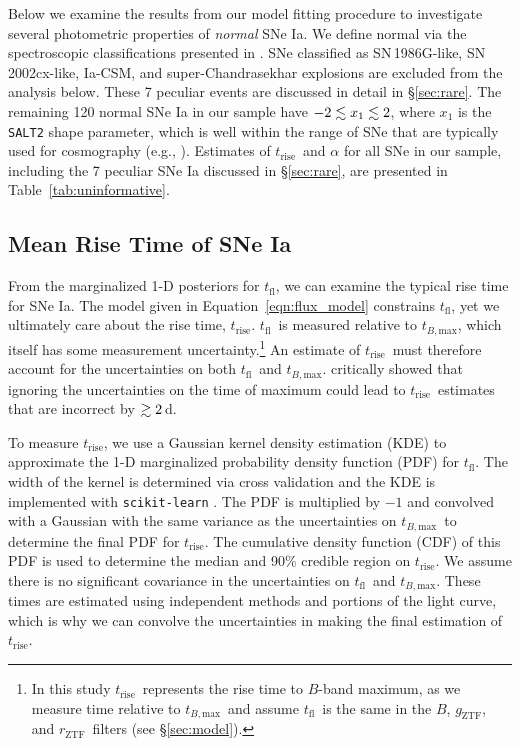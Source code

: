 \documentclass[twocolumn]{./aastex63}
\newcommand{\rztf}{$r_\mathrm{ZTF}$}
\newcommand{\gztf}{$g_\mathrm{ZTF}$}
\newcommand{\tfl}{$t_\mathrm{fl}$}
\newcommand{\trise}{$t_\mathrm{rise}$}
\newcommand{\tbmax}{$t_{B,\mathrm{max}}$}
\begin{document}
Below we examine the results from our model fitting procedure to investigate
several photometric properties of \textit{normal} SNe Ia. We define normal via
the spectroscopic classifications presented in \citet{Yao19}. SNe classified
as SN\,1986G-like, SN\,2002cx-like, Ia-CSM, and super-Chandrasekhar explosions
are excluded from the analysis below. These 7 peculiar events are discussed in
detail in \S\ref{sec:rare}. The remaining 120 normal SNe Ia in our sample
have $-2 \lesssim x_1 \lesssim 2$, where $x_1$ is the \texttt{SALT2} shape parameter,
which is well within the range of SNe that are typically used for cosmography
(e.g., \citealt{Scolnic18}). Estimates of \trise\ and $\alpha$ for all SNe in
our sample, including the 7 peculiar SNe Ia discussed in \S\ref{sec:rare}, are
presented in Table~\ref{tab:uninformative}.

\subsection{Mean Rise Time of SNe Ia}\label{sec:mean_rise}

From the marginalized 1-D posteriors for \tfl, we can examine the typical rise
time for SNe Ia. The model given in Equation~\ref{eqn:flux_model} constrains
\tfl, yet we ultimately care about the rise time, \trise. \tfl\ is measured
relative to \tbmax, which itself has some measurement uncertainty.\footnote{In
this study \trise\ represents the rise time to $B$-band maximum, as we measure
time relative to \tbmax\ and assume \tfl\ is the same in the $B$, \gztf, and
\rztf\ filters (see \S\ref{sec:model}).} An estimate of \trise\ must therefore
account for the uncertainties on both \tfl\ and \tbmax. \citet{Aldering00}
critically showed that ignoring the uncertainties on the time of maximum could
lead to \trise\ estimates that are incorrect by $\gtrsim 2$\,d.

To measure \trise, we use a Gaussian kernel density estimation (KDE) to
approximate the 1-D marginalized probability density function (PDF) for \tfl.
The width of the kernel is determined via cross validation and the KDE is
implemented with \texttt{scikit-learn} \citep{Pedregosa11}. The PDF is
multiplied by $-1$ and convolved with a Gaussian with the same variance as the
uncertainties on \tbmax\ to determine the final PDF for \trise. The cumulative
density function (CDF) of this PDF is used to determine the median and 90\%
credible region on \trise. We assume there is no significant covariance in the
uncertainties on \tfl\ and \tbmax. These times are estimated using independent
methods and portions of the light curve, which is why we can convolve the
uncertainties in making the final estimation of \trise.
\end{document}
